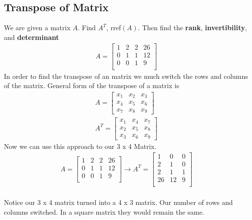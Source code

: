 \documentclass[12pt]{article}
\begin{document}
\subsection{Transpose of Matrix}
We are given a matrix $A$. Find $A^{T}$, rref$(A)$. Then find the \textbf{rank}, \textbf{invertibility}, and \textbf{determinant}
\begin{align*}
A = \begin{bmatrix}
  1 & 2 & 2 & 26 \\
  0 & 1 & 1 & 12 \\
 0 & 0 & 1 & 9 \\
\end{bmatrix}
\end{align*}
\medskip
\newline
In order to find the transpose of an matrix we much switch the rows and columns of the matrix. General form of the transpose of a matrix is
\begin{align*}
A = \begin{bmatrix}
  x_{1} & x_{2} & x_{3} \\
  x_{4} & x_{5} & x_{6} \\
  x_{7} & x_{8} & x_{9}
\end{bmatrix}
\\
A^{T} = \begin{bmatrix}
  x_{1} & x_{4} & x_{7} \\
  x_{2} & x_{5} & x_{8} \\
  x_{3} & x_{6} & x_{9}
\end{bmatrix}
\end{align*}
Now we can use this approach to our 3 x 4 Matrix.
\begin{align*}
A = \begin{bmatrix}
  1 & 2 & 2 & 26 \\
  0 & 1 & 1 & 12 \\
 0 & 0 & 1 & 9 \\
\end{bmatrix}
\rightarrow
A^{T} = \begin{bmatrix}
 1 & 0 & 0  \\
 2 & 1 & 0  \\
 2 & 1 & 1  \\
 26 & 12 & 9  \\
 \end{bmatrix}
\end{align*}
\\ Notice our 3 x 4 matrix turned into a 4 x 3 matrix. Our number of rows and columns switched. In a square matrix they would remain the same. \\\\
\end{document}
